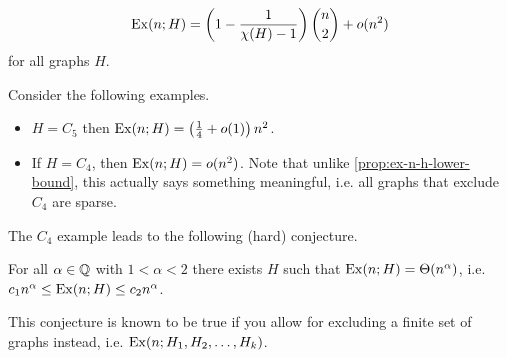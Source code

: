 \documentclass[main.tex]{subfiles}
\begin{document}
\begin{theorem}%
  \th\label{thm:erdos-stone}
  \leavevmode\vspace{-1em}
  \[
    \operatorname{Ex}(n;H) = \left(1 - \frac{1}{\chi(H) - 1}\right)\binom n 2 + o(n^2)
  \]
  for all graphs $H$.
\end{theorem}
Consider the following examples.
\begin{example*}
  \listhack
  \begin{itemize}
    \item $H = C_5$ then $\operatorname{Ex}(n;H) = \left(\frac 1 4 + o(1)\right)n^2$.
    \item If $H = C_4$, then $\operatorname{Ex}(n;H) = o(n^2)$.
      Note that unlike \th\ref{prop:ex-n-h-lower-bound},
      this actually says something meaningful, i.e. all graphs that exclude
      $C_4$ are sparse.
  \end{itemize}
\end{example*}
The $C_4$ example leads to the following (hard) conjecture.
\begin{conjecture*}
  For all $\alpha\in\mathbb Q$ with $1 < \alpha < 2$ there exists $H$ such that
  $\operatorname{Ex}(n;H) = \Theta(n^\alpha)$,
  i.e. $c_1 n^\alpha\leq\operatorname{Ex}(n;H)\leq c_2 n^\alpha$.
\end{conjecture*}
This conjecture is known to be true if you allow for excluding a finite set of
graphs instead, i.e. $\operatorname{Ex}(n;H_1,H_2,\ldots,H_k)$.
\end{document}
